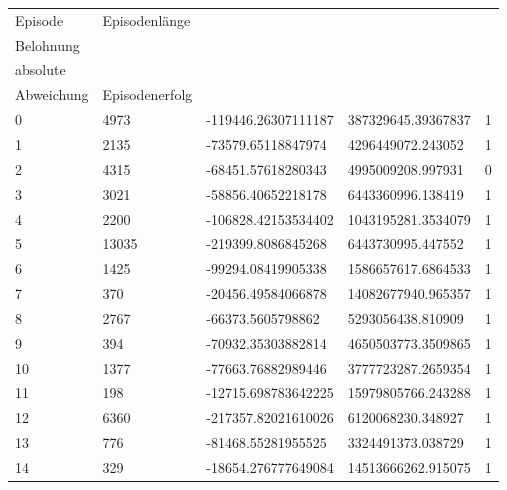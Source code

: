 \begin{longtable}{lllll}
    Episode & Episodenlänge & \begin{tabular}[c]{@{}l@{}}kumulierte \\ Belohnung\end{tabular} & \begin{tabular}[c]{@{}l@{}}quadrierte \\ absolute \\ Abweichung\end{tabular} & Episodenerfolg \\
    \endhead
    0 & 4973 & -119446.26307111187 & 387329645.39367837 & 1 \\
    1 & 2135 & -73579.65118847974 & 4296449072.243052 & 1 \\
    2 & 4315 & -68451.57618280343 & 4995009208.997931 & 0 \\
    3 & 3021 & -58856.40652218178 & 6443360996.138419 & 1 \\
    4 & 2200 & -106828.42153534402 & 1043195281.3534079 & 1 \\
    5 & 13035 & -219399.8086845268 & 6443730995.447552 & 1 \\
    6 & 1425 & -99294.08419905338 & 1586657617.6864533 & 1 \\
    7 & 370 & -20456.49584066878 & 14082677940.965357 & 1 \\
    8 & 2767 & -66373.5605798862 & 5293056438.810909 & 1 \\
    9 & 394 & -70932.35303882814 & 4650503773.3509865 & 1 \\
    10 & 1377 & -77663.76882989446 & 3777723287.2659354 & 1 \\
    11 & 198 & -12715.698783642225 & 15979805766.243288 & 1 \\
    12 & 6360 & -217357.82021610026 & 6120068230.348927 & 1 \\
    13 & 776 & -81468.55281955525 & 3324491373.038729 & 1 \\
    14 & 329 & -18654.276777649084 & 14513666262.915075 & 1 \\

\end{longtable}
